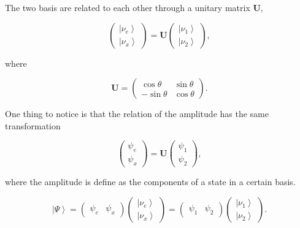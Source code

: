 \documentclass{sciposter}
\newcommand{\ket}[1]{\left| #1\right\rangle}
\begin{document}
\begin{multicols}{3}
The two basis are related to each other through a unitary matrix $\mathbf{U}$,

\begin{equation}
     \begin{pmatrix}
     \ket{\nu_e} \\
     \ket{\nu_x}
     \end{pmatrix} =
     \mathbf{U}
     \begin{pmatrix}
     \ket{\nu_1} \\
     \ket{\nu_2}
     \end{pmatrix},
\end{equation}


where

\begin{equation}
     \mathbf{U}=\begin{pmatrix}
     \cos \theta & \sin \theta \\
     -\sin \theta & \cos \theta
     \end{pmatrix}.
\end{equation}

One thing to notice is that the relation of the amplitude has the same transformation

\begin{equation}
     \begin{pmatrix}
     \psi_e \\
     \psi_x
     \end{pmatrix} =
     \mathbf{U}
     \begin{pmatrix}
     \psi_1 \\
     \psi_2
     \end{pmatrix},
\end{equation}

where the amplitude is define as the components of a state in a certain basis.

\begin{equation}
     \ket{\Psi} = \begin{pmatrix}
      \psi_e  & \psi_x
     \end{pmatrix} \begin{pmatrix}
     \ket{\nu_e} \\
     \ket{\nu_x}
     \end{pmatrix} =  \begin{pmatrix}
      \psi_1  & \psi_2
     \end{pmatrix} \begin{pmatrix}
     \ket{\nu_1} \\
     \ket{\nu_2}
     \end{pmatrix}.
\end{equation}




\end{multicols}
\end{document}
